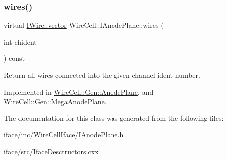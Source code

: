 \mbox{\label{class_wire_cell_1_1_i_anode_plane_a58f3e7e47cfe10a141e0275f80dcc789}} 
\subsubsection{\texorpdfstring{wires()}{wires()}}
{\footnotesize\ttfamily virtual \hyperlink{class_wire_cell_1_1_i_data_ae1a9f863380499bb43f39fabb6276660}{I\+Wire\+::vector} Wire\+Cell\+::\+I\+Anode\+Plane\+::wires (\begin{DoxyParamCaption}\item[{int}]{chident }\end{DoxyParamCaption}) const\hspace{0.3cm}{\ttfamily [pure virtual]}}



Return all wires connected into the given channel ident number. 



Implemented in \hyperlink{class_wire_cell_1_1_gen_1_1_anode_plane_ad16d32c787a7ee9ea8c6c556bbab2e4f}{Wire\+Cell\+::\+Gen\+::\+Anode\+Plane}, and \hyperlink{class_wire_cell_1_1_gen_1_1_mega_anode_plane_a1d4b6dd24d9b2d805120eed53e153bc3}{Wire\+Cell\+::\+Gen\+::\+Mega\+Anode\+Plane}.



The documentation for this class was generated from the following files\+:\begin{DoxyCompactItemize}
\item 
iface/inc/\+Wire\+Cell\+Iface/\hyperlink{_i_anode_plane_8h}{I\+Anode\+Plane.\+h}\item 
iface/src/\hyperlink{_iface_desctructors_8cxx}{Iface\+Desctructors.\+cxx}\end{DoxyCompactItemize}
